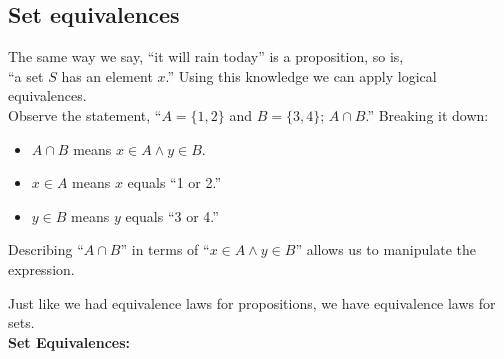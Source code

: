 \subsection{Set equivalences}

\noindent
The same way we say, ``it will rain today'' is a proposition, so is,\\
``a set $S$ has an element $x$.'' Using this knowledge we can apply logical equivalences.\\

\noindent
Observe the statement, ``$A=\{1,2\}$ and $B=\{3,4\}$; $A \cap B$.'' Breaking it down:
\begin{itemize}
    \item $A \cap B$ means $x\in A \land y\in B$.
    \item $x\in A$ means $x$ equals ``1 or 2.''
    \item $y\in B$ means $y$ equals ``3 or 4.''
\end{itemize}

\noindent
Describing ``$A \cap B$'' in terms of ``$x\in A \land y\in B$'' allows us to manipulate the expression.\\

\newpage

\noindent
Just like we had equivalence laws for propositions, we have equivalence laws for sets.\\

\noindent
{\Large \textbf{Set Equivalences:}\\}

